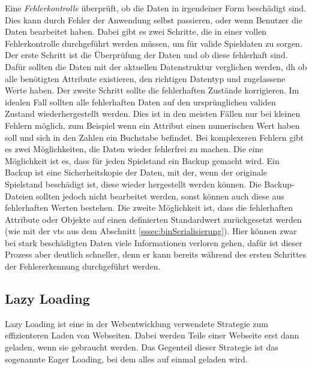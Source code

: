 Eine \textit{Fehlerkontrolle} überprüft, ob die Daten in irgendeiner Form beschädigt sind. Dies kann durch Fehler der Anwendung selbst passieren, oder wenn Benutzer die Daten bearbeitet haben. Dabei gibt es zwei Schritte, die in einer vollen Fehlerkontrolle durchgeführt werden müssen, um für valide Spieldaten zu sorgen. Der erste Schritt ist die Überprüfung der Daten und ob diese fehlerhaft sind. Dafür sollten die Daten mit der aktuellen Datenstruktur verglichen werden, \ac{dh} ob alle benötigten Attribute existieren, den richtigen Datentyp und zugelassene Werte haben. Der zweite Schritt sollte die fehlerhaften Zustände korrigieren. Im idealen Fall sollten alle fehlerhaften Daten auf den ursprünglichen validen Zustand wiederhergestellt werden. Dies ist in den meisten Fällen nur bei kleinen Fehlern möglich, zum Beispiel wenn ein Attribut einen numerischen Wert haben soll und sich in den Zahlen ein Buchstabe befindet. Bei komplexeren Fehlern gibt es zwei Möglichkeiten, die Daten wieder fehlerfrei zu machen. Die eine Möglichkeit ist es, dass für jeden Spielstand ein Backup gemacht wird. Ein Backup ist eine Sicherheitskopie der Daten, mit der, wenn der originale Spielstand beschädigt ist, diese wieder hergestellt werden können.\cite{ibmDevelopingBackup} Die Backup-Dateien sollten jedoch nicht bearbeitet werden, sonst können auch diese aus fehlerhaften Werten bestehen. Die zweite Möglichkeit ist, dass die fehlerhaften Attribute oder Objekte auf einen definierten Standardwert zurückgesetzt werden (wie mit der \ac{vts} aus dem Abschnitt \ref{sssec:binSerialisierung}). Hier können zwar bei stark beschädigten Daten viele Informationen verloren gehen, dafür ist dieser Prozess aber deutlich schneller, denn er kann bereits während des ersten Schrittes der Fehlererkennung durchgeführt werden.



\subsection{Lazy Loading} \label{ssect:lazyloading}
Lazy Loading ist eine in der Webentwicklung verwendete Strategie zum effizienteren Laden von Webseiten. Dabei werden Teile einer Webseite erst dann geladen, wenn sie gebraucht werden. Das Gegenteil dieser Strategie ist das sogenannte Eager Loading, bei dem alles auf einmal geladen wird.\cite{cloudflareLazyLoad}

